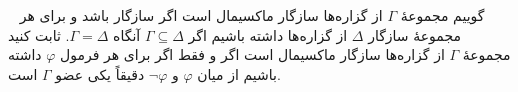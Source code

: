 ~
گوییم مجموعهٔ
$\Gamma$
از گزاره‌ها
سازگار ماکسیمال است اگر سازگار باشد و برای هر مجموعهٔ سازگار
$\Delta$
از گزاره‌ها داشته باشیم اگر
$\Gamma\subseteq\Delta$
آنگاه
$\Gamma=\Delta$. ثابت کنید مجموعهٔ
$\Gamma$
از گزاره‌ها سازگار ماکسیمال است اگر و فقط اگر برای هر فرمول
$\varphi$
داشته باشیم از میان
$\varphi$
و
$\neg\varphi$
دقیقاً یکی عضو
$\Gamma$
است.
